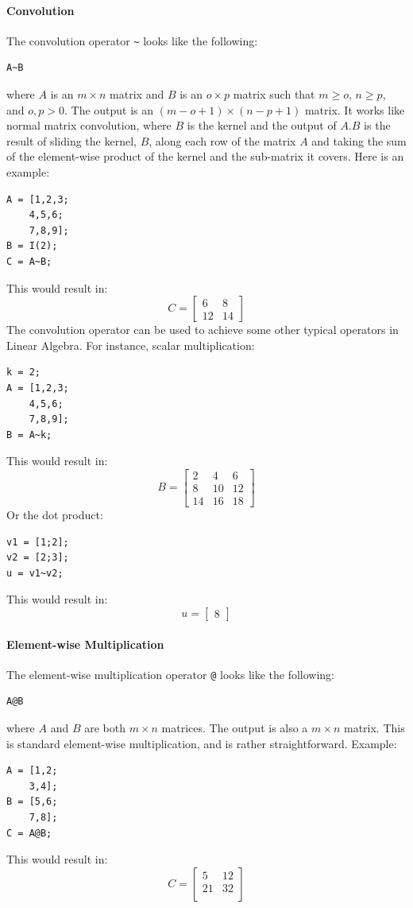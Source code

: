 \paragraph{Convolution}
The convolution operator \verb=~= looks like the following:
\begin{lstlisting}
A~B
\end{lstlisting}
where $A$ is an $m\times n $ matrix and $B$ is an $o\times p$ matrix such that $m\geq o$, $n\geq p$, and $o,p>0$.  The output is an $(m-o+1)\times (n-p+1)$ matrix.  It works like normal matrix convolution, where $B$ is the kernel and the output of $A.B$ is the result of sliding the kernel, $B$, along each row of the matrix $A$ and taking the sum of the element-wise product of the kernel and the sub-matrix it covers. Here is an example:
\begin{lstlisting}
A = [1,2,3;
    4,5,6;
    7,8,9];
B = I(2);
C = A~B;
\end{lstlisting}
This would result in:
$$C=\begin{bmatrix}
6&8\\
12&14
\end{bmatrix}$$
The convolution operator can be used to achieve some other typical operators in Linear Algebra.  For instance, scalar multiplication:
\begin{lstlisting}
k = 2;
A = [1,2,3;
    4,5,6;
    7,8,9];
B = A~k;
\end{lstlisting}
This would result in:
$$B=\begin{bmatrix}
2&4&6\\
8&10&12\\
14&16&18
\end{bmatrix}$$
Or the dot product:
\begin{lstlisting}
v1 = [1;2];
v2 = [2;3];
u = v1~v2;
\end{lstlisting}
This would result in:
$$u=\begin{bmatrix}
8
\end{bmatrix}$$

\paragraph{Element-wise Multiplication}
The element-wise multiplication operator \verb=@= looks like the following:
\begin{lstlisting}
A@B
\end{lstlisting}
where $A$ and $B$ are both $m\times n$ matrices.  The output is also a $m \times n$ matrix. This is standard element-wise multiplication, and is rather straightforward.  Example:
\begin{lstlisting}
A = [1,2;
    3,4];
B = [5,6;
    7,8];
C = A@B;
\end{lstlisting}
This would result in:
$$C=\begin{bmatrix}
5&12\\
21&32\\
\end{bmatrix}$$

